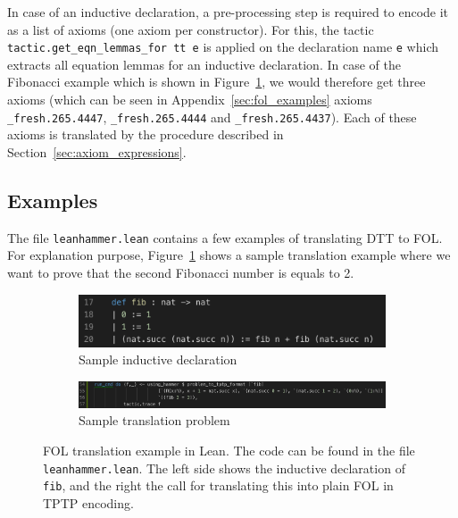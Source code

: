 \documentclass[a4paper]{article}
\begin{document}
In case of an inductive declaration, a pre-processing step is required to encode it as a list of axioms (one axiom per constructor). For this, the tactic \texttt{tactic.get\_eqn\_lemmas\_for tt e} is applied on the declaration name \texttt{e} which extracts all equation lemmas for an inductive declaration. In case of the Fibonacci example which is shown in Figure~\ref{fig:fol_example_declaration}, we would therefore get three axioms (which can be seen in Appendix~\ref{sec:fol_examples} axioms \texttt{\_fresh.265.4447}, \texttt{\_fresh.265.4444} and \texttt{\_fresh.265.4437}). Each of these axioms is translated by the procedure described in Section~\ref{sec:axiom_expressions}.

\subsection{Examples}
The file \texttt{leanhammer.lean} contains a few examples of translating DTT to FOL. For explanation purpose, Figure~\ref{fig:fol_example_declaration} shows a sample translation example where we want to prove that the second Fibonacci number is equals to 2.
\begin{figure}[ht!]
	\centering
	\begin{subfigure}{0.33\textwidth}
		\centering
		\includegraphics[width=\textwidth]{figures/fol_example_fib_definition.png}
		\caption{Sample inductive declaration}
		\label{fig:fol_example_declaration}
	\end{subfigure}
	\hspace{1mm}
	\begin{subfigure}{0.65\textwidth}
		\centering
		\includegraphics[width=\textwidth]{figures/fol_example_call.png}
		\caption{Sample translation problem}
		\label{fig:fol_example_translation}
	\end{subfigure}
	\caption{FOL translation example in Lean. The code can be found in the file \texttt{leanhammer.lean}. The left side shows the inductive declaration of \texttt{fib}, and the right the call for translating this into plain FOL in TPTP encoding. }
	\label{fig:fol_example}
\end{figure}
\end{document}
